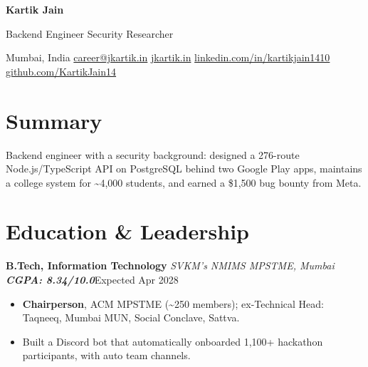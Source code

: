 \documentclass[10pt, a4paper]{article}
\newcommand{\role}[3]{\par\vspace{2.5pt}\textbf{#1} \textbar{} \textit{#2}\hfill #3\par}
\newcommand{\lnk}[2]{\href{#1}{\color{linkc}#2}}
\newcommand{\sep}{\enspace\textbar\enspace}
\begin{document}
\begin{center}
  {\fontsize{22pt}{24pt}\selectfont\bfseries Kartik Jain}\par\vspace{3pt}
  {\normalsize Backend Engineer \textbar{} Security Researcher}\par\vspace{3pt}
  {\small Mumbai, India\sep
  \lnk{mailto:career@jkartik.in}{career@jkartik.in}\sep
  \lnk{https://jkartik.in/}{jkartik.in}\sep
  \lnk{https://linkedin.com/in/kartikjain1410}{linkedin.com/in/kartikjain1410}\sep
  \lnk{https://github.com/KartikJain14}{github.com/KartikJain14}}
\end{center}

\section{Summary}
Backend engineer with a security background: designed a 276-route Node.js/TypeScript API on PostgreSQL behind two Google Play
apps, maintains a college system for \textasciitilde{}4,000 students, and earned a \$1,500 bug bounty from Meta.

\section{Education \& Leadership}
\role{B.Tech, Information Technology}{SVKM's NMIMS MPSTME, Mumbai \textbar{} \textup{\textbf{CGPA: 8.34/10.0}}}{Expected Apr 2028}
\begin{itemize}
  \item \textbf{Chairperson}, ACM MPSTME (\textasciitilde{}250 members); ex-Technical Head: Taqneeq, Mumbai MUN, Social Conclave, Sattva.
  \item Built a Discord bot that automatically onboarded 1,100+ hackathon participants, with auto team channels.
\end{itemize}
\end{document}
